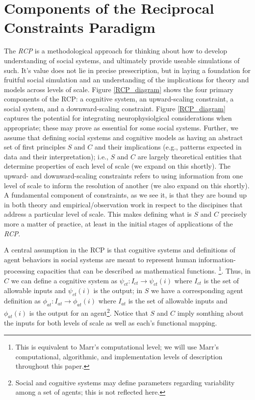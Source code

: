 \documentclass{article}
\begin{document}
\section{Components of the Reciprocal Constraints Paradigm}
The \textit{RCP} is a methodological approach for thinking about how to develop understanding of social systems, and ultimately provide useable simulations of such.  It's value does not lie in precise presecription, but in laying a foundation for fruitful social simulation and an understanding of the implications for theory and models across levels of scale.  Figure \ref{RCP_diagram} shows the four primary components of the RCP: a cognitive system, an upward-scaling constraint, a social system, and a downward-scaling constraint.  Figure \ref{RCP_diagram} captures the potential for integrating neurophysiolgical considerations when appropriate; these may prove as essential for some social systems. Further, we assume that defining social systems and cognitive models as having an abstract set of first principles $S$ and $C$ and their implications (e.g., patterns expected in data and their interpretation); i.e., $S$ and $C$ are largely theoretical entities that determine properties of each level of scale (we expand on this shortly).  The upward- and downward-scaling constraints refers to using information from one level of scale to inform the resolution of another (we also expand on this shortly).  A fundamental component of constraints, as we see it, is that they are bound up in both theory and empirical/observation work in respect to the discipines that address a particular level of scale.  This makes defining what is $S$ and $C$ precisely more a matter of practice, at least in the initial stages of applications of the \textit{RCP}.

A central assumption in the RCP is that cognitive systems and definitions of agent behaviors in social systems are meant to represent human information-processing capacities that can be described as mathematical functions. \cite{van Rooij, 2008}\footnote{This is equivalent to Marr's computational level; we will use Marr's computational, algorithmic, and implementation levels of description\cite{Marr,1981} throughout this paper.}. Thus, in $C$ we can define a cognitive system as $\psi_{ct}: I_{ct} \rightarrow \psi_{ct}(i)$ where $I_{ct}$ is the set of allowable inputs and $\psi_{ct}(i)$ is the output; in $S$ we have a corresponding agent definition as $\phi_{at}: I_{at} \rightarrow \phi_{at}(i)$ where $I_{at}$ is the set of allowable inputs and $\phi_{at}(i)$ is the output for an agent\footnote{Social and cognitive systems may define parameters regarding variability among a set of agents; this is not reflected here.}.  Notice that $S$ and $C$ imply somthing about the inputs for both levels of scale as well as each's functional mapping.
\end{document}
